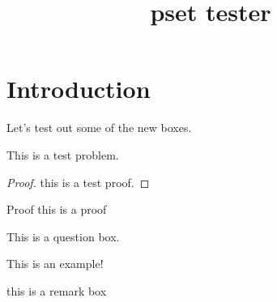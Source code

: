 \documentclass{scrartcl}
\title{pset tester}
\begin{document}
\maketitle

\section{Introduction}
Let's test out some of the new boxes.
\begin{problembox}
        This is a test problem.
\end{problembox}
\begin{proof}
        this is a test proof.
\end{proof}
\begin{proof*}{Proof}
        this is a proof
\end{proof*}


\begin{questionbox}
        This is a question box.
\end{questionbox}

\begin{examplebox}
        This is an example!
\end{examplebox}

\begin{remarkbox}
        this is a remark box
\end{remarkbox}

\newpset

\end{document}
